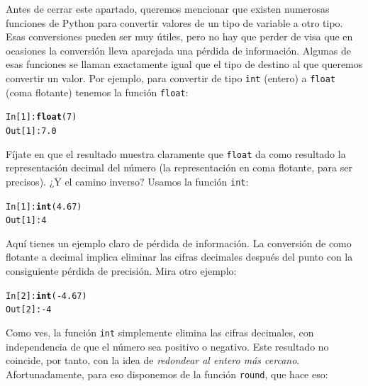 \documentclass[10pt,a4paper]{article}\usepackage[]{graphicx}\usepackage[]{color}
\makeatletter
\newcommand{\hlnum}[1]{\textcolor[rgb]{0.686,0.059,0.569}{#1}}%
\newcommand{\hlopt}[1]{\textcolor[rgb]{0,0,0}{#1}}%
\newcommand{\hlstd}[1]{\textcolor[rgb]{0.345,0.345,0.345}{#1}}%
\newcommand{\hlkwd}[1]{\textcolor[rgb]{0.737,0.353,0.396}{\textbf{#1}}}%
\newenvironment{kframe}{%
 \def\at@end@of@kframe{}%
 \ifinner\ifhmode%
  \def\at@end@of@kframe{\end{minipage}}%
  \begin{minipage}{\columnwidth}%
 \fi\fi%
 \def\FrameCommand##1{\hskip\@totalleftmargin \hskip-\fboxsep
 \colorbox{shadecolor}{##1}\hskip-\fboxsep
     \hskip-\linewidth \hskip-\@totalleftmargin \hskip\columnwidth}%
 \MakeFramed {\advance\hsize-\width
   \@totalleftmargin\z@ \linewidth\hsize
   \@setminipage}}%
 {\par\unskip\endMakeFramed%
 \at@end@of@kframe}
\newenvironment{knitrout}{}{} %
\makeatother
\begin{document}
Antes de cerrar este apartado, queremos mencionar que existen numerosas funciones de Python para convertir valores de un tipo de variable a otro tipo. Esas conversiones pueden ser muy útiles, pero no hay que perder de visa que en ocasiones la conversión lleva aparejada una pérdida de información. Algunas de esas funciones se llaman exactamente igual que el tipo de destino al que queremos convertir un valor. Por ejemplo, para convertir de tipo {\tt int} (entero) a {\tt float} (coma flotante) tenemos la función {\tt float}:
\begin{knitrout}
\color{fgcolor}\begin{kframe}
\begin{alltt}
\hlstd{In [}\hlnum{1}\hlstd{]}\hlopt{:} \hlkwd{float}\hlstd{(}\hlnum{7}\hlstd{)}
\hlstd{Out[}\hlnum{1}\hlstd{]}\hlopt{:} \hlnum{7.0}
\end{alltt}
\end{kframe}
\end{knitrout}
Fíjate en que el resultado muestra claramente que {\tt float} da como resultado la representación decimal del número (la representación en coma flotante, para ser precisos). ¿Y el camino inverso? Usamos la función {\tt int}:
\begin{knitrout}
\color{fgcolor}\begin{kframe}
\begin{alltt}
\hlstd{In [}\hlnum{1}\hlstd{]}\hlopt{:} \hlkwd{int}\hlstd{(}\hlnum{4.67}\hlstd{)}
\hlstd{Out[}\hlnum{1}\hlstd{]}\hlopt{:} \hlnum{4}
\end{alltt}
\end{kframe}
\end{knitrout}
Aquí tienes un ejemplo claro de pérdida de información. La conversión de como flotante a decimal implica eliminar las cifras decimales después del punto con la consiguiente pérdida de precisión. Mira otro ejemplo:
\begin{knitrout}
\color{fgcolor}\begin{kframe}
\begin{alltt}
\hlstd{In [}\hlnum{2}\hlstd{]}\hlopt{:} \hlkwd{int}\hlstd{(}\hlopt{-}\hlnum{4.67}\hlstd{)}
\hlstd{Out[}\hlnum{2}\hlstd{]}\hlopt{: -}\hlnum{4}
\end{alltt}
\end{kframe}
\end{knitrout}
Como ves, la función {\tt int} simplemente elimina las cifras decimales, con independencia de que el número sea positivo o negativo. Este resultado no coincide, por tanto, con la idea de {\em redondear al entero más cercano}. Afortunadamente, para eso disponemos de la función {\tt round}, que hace eso:
\end{document}
